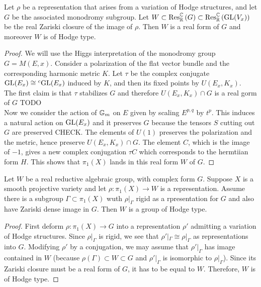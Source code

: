 \documentclass[12pt]{article}
\begin{document}
\begin{prop}
Let $\rho$ be a representation that arises from a variation of Hodge structures, and let $G$ be the associated monodromy subgroup. Let $W \subset \mathrm{Res}^{\mathbb{C}}_{\mathbb{R}} \left( G \right) \subset \mathrm{Res}^{\mathbb{C}}_{\mathbb{R}} \left( \mathrm{GL}(V_x) \right)$ be the real Zariski closure of the image of $\rho$. Then $W$ is a real form of $G$ and moreover $W$ is of Hodge type.
\end{prop}

\begin{proof}
We will use the Higgs interpretation of the monodromy group $G = M(E, x)$. Consider a polarization of the flat vector bundle and the corresponding harmonic metric $K$. Let $\tau$ be the complex conjugate $\mathrm{GL}(E_x) \cong {}^c \mathrm{GL}(E_x)$ induced by $K$, and then its fixed points by $U(E_x, K_x)$. 
\bigskip\\
The first claim is that $\tau$ stabilizes $G$ and therefore $U(E_x, K_x) \cap G$ is a real gorm of $G$ {\color{red} TODO}
\bigskip\\
Now we consider the action of $\mathbb{G}_m$ on $E$ given by scaling $E^{p,q}$ by $t^p$. This induces a natural action on $\mathrm{GL}(E_x)$ and it preserves $G$ because the tensors $S$ cutting out $G$ are preserved {\color{red} CHECK}. The elements of $U(1)$ preserves the polarization and the metric, hence preserve $U(E_x, K_x) \cap G$. The element $C$, which is the image of $-1$, gives a new complex conjugation $\tau C$ which corresponds to the hermtiian form $H$. This shows that $\pi_1(X)$ lands in this real form $W$ of $G$.
\end{proof}

\begin{cor}
Let $W$ be a real reductive algebraic group, with complex form $G$. Suppose $X$ is a smooth projective variety and let $\rho : \pi_1(X) \to W$ is a representation. Assume there is a subgroup $\Gamma \subset \pi_1(X)$ wuth $\rho|_\Gamma$ rigid as a rpresentation for $G$ and also have Zariski dense image in $G$. Then $W$ is a group of Hodge type.
\end{cor}

\begin{proof}
First deform $\rho : \pi_1(X) \to G$ into a representation $\rho'$ admitting a variation of Hodge structures. Since $\rho|_\Gamma$ is rigid, we see that $\rho'|_\Gamma \cong \rho|_\Gamma$ as representations into $G$. Modifying $\rho'$ by a conjugation, we may assume that $\rho'|_\Gamma$ has image contained in $W$ (because $\rho(\Gamma) \subset W \subset G$ and $\rho'|_\Gamma$ is isomorphic to $\rho|_\Gamma$). Since its Zariski closure must be a real form of $G$, it has to be equal to $W$. Therefore, $W$ is of Hodge type. 
\end{proof}
\end{document}

